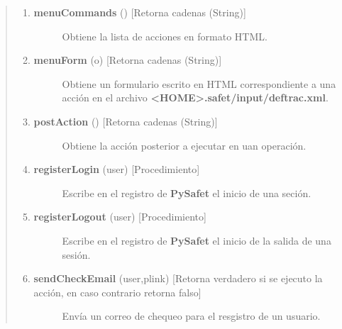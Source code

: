 \documentclass[letterpaper,11pt,spanish]{sphinxmanual}
\begin{document}
\begin{quote}
\begin{enumerate}
\item {} \begin{description}
\item[{\textbf{menuCommands} () {[}Retorna cadenas (String){]}}] \leavevmode
Obtiene la lista de acciones en formato HTML.

\end{description}

\item {} \begin{description}
\item[{\textbf{menuForm} (o) {[}Retorna cadenas (String){]}}] \leavevmode
Obtiene un formulario escrito en HTML correspondiente a una acción en el archivo \textbf{\textless{}HOME\textgreater{}.safet/input/deftrac.xml}.

\end{description}

\item {} \begin{description}
\item[{\textbf{postAction} () {[}Retorna cadenas (String){]}}] \leavevmode
Obtiene la acción posterior a ejecutar en uan operación.

\end{description}

\item {} \begin{description}
\item[{\textbf{registerLogin} (user) {[}Procedimiento{]}}] \leavevmode
Escribe en el registro de \textbf{PySafet} el inicio de una seción.

\end{description}

\item {} \begin{description}
\item[{\textbf{registerLogout} (user) {[}Procedimiento{]}}] \leavevmode
Escribe en el registro de \textbf{PySafet} el inicio de la salida de una sesión.

\end{description}

\item {} \begin{description}
\item[{\textbf{sendCheckEmail} (user,plink) {[}Retorna verdadero si se ejecuto la acción, en caso contrario retorna falso{]}}] \leavevmode
Envía un correo de chequeo para el resgistro de un usuario.


\end{description}
\end{enumerate}
\end{quote}
\end{document}
